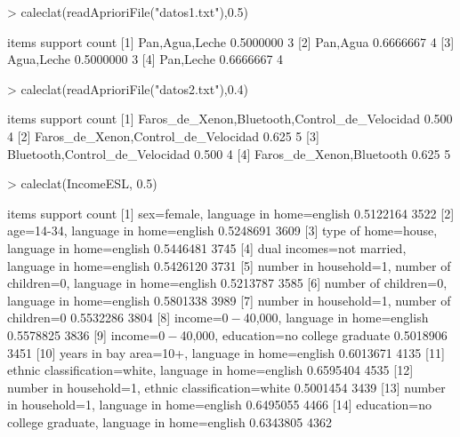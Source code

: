 \documentclass [a4paper] {article}
\begin{document}
\begin{Schunk}
\begin{Sinput}
> caleclat(readAprioriFile("datos1.txt"),0.5)
\end{Sinput}
\begin{Soutput}
    items            support   count
[1] {Pan,Agua,Leche} 0.5000000 3    
[2] {Pan,Agua}       0.6666667 4    
[3] {Agua,Leche}     0.5000000 3    
[4] {Pan,Leche}      0.6666667 4    
\end{Soutput}
\end{Schunk}

\begin{Schunk}
\begin{Sinput}
> caleclat(readAprioriFile("datos2.txt"),0.4)
\end{Sinput}
\begin{Soutput}
    items                                           support count
[1] {Faros_de_Xenon,Bluetooth,Control_de_Velocidad} 0.500   4    
[2] {Faros_de_Xenon,Control_de_Velocidad}           0.625   5    
[3] {Bluetooth,Control_de_Velocidad}                0.500   4    
[4] {Faros_de_Xenon,Bluetooth}                      0.625   5    
\end{Soutput}
\end{Schunk}

\begin{Schunk}
\begin{Sinput}
> caleclat(IncomeESL, 0.5)
\end{Sinput}
\begin{Soutput}
     items                             support count
[1]  {sex=female,                                   
      language in home=english}      0.5122164  3522
[2]  {age=14-34,                                    
      language in home=english}      0.5248691  3609
[3]  {type of home=house,                           
      language in home=english}      0.5446481  3745
[4]  {dual incomes=not married,                     
      language in home=english}      0.5426120  3731
[5]  {number in household=1,                        
      number of children=0,                         
      language in home=english}      0.5213787  3585
[6]  {number of children=0,                         
      language in home=english}      0.5801338  3989
[7]  {number in household=1,                        
      number of children=0}          0.5532286  3804
[8]  {income=$0-$40,000,                            
      language in home=english}      0.5578825  3836
[9]  {income=$0-$40,000,                            
      education=no college graduate} 0.5018906  3451
[10] {years in bay area=10+,                        
      language in home=english}      0.6013671  4135
[11] {ethnic classification=white,                  
      language in home=english}      0.6595404  4535
[12] {number in household=1,                        
      ethnic classification=white}   0.5001454  3439
[13] {number in household=1,                        
      language in home=english}      0.6495055  4466
[14] {education=no college graduate,                
      language in home=english}      0.6343805  4362
\end{Soutput}
\end{Schunk}
\end{document}
